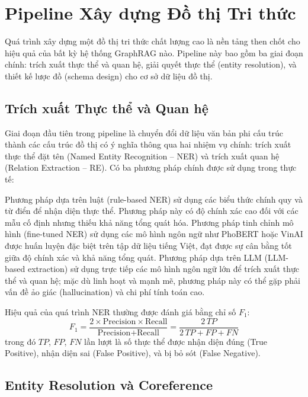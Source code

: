 \documentclass[12pt,a4paper]{report}
\theoremstyle{plain}
\theoremstyle{definition}
\begin{document}
	\section{Pipeline Xây dựng Đồ thị Tri thức}
	\label{sec:kg_pipeline}
	
	Quá trình xây dựng một đồ thị tri thức chất lượng cao là nền tảng then chốt
	cho hiệu quả của bất kỳ hệ thống GraphRAG nào. Pipeline này bao gồm ba giai
	đoạn chính: trích xuất thực thể và quan hệ, giải quyết thực thể (entity
	resolution), và thiết kế lược đồ (schema design) cho cơ sở dữ liệu đồ thị.
	
	\subsection{Trích xuất Thực thể và Quan hệ}
	\label{subsec:ner_relation_extraction}
	
	Giai đoạn đầu tiên trong pipeline là chuyển đổi dữ liệu văn bản phi cấu trúc
	thành các cấu trúc đồ thị có ý nghĩa thông qua hai nhiệm vụ chính: trích xuất
	thực thể đặt tên (Named Entity Recognition -- NER) và trích xuất quan hệ
	(Relation Extraction -- RE). Có ba phương pháp chính được sử dụng trong thực tế:
	
	Phương pháp dựa trên luật (rule-based NER) sử dụng các biểu thức chính quy
	và từ điển để nhận diện thực thể. Phương pháp này có độ chính xác cao đối với
	các mẫu cố định nhưng thiếu khả năng tổng quát hóa. Phương pháp tinh chỉnh mô
	hình (fine-tuned NER) sử dụng các mô hình ngôn ngữ như PhoBERT hoặc VinAI được
	huấn luyện đặc biệt trên tập dữ liệu tiếng Việt, đạt được sự cân bằng tốt giữa
	độ chính xác và khả năng tổng quát. Phương pháp dựa trên LLM (LLM-based
	extraction) sử dụng trực tiếp các mô hình ngôn ngữ lớn để trích xuất thực thể
	và quan hệ; mặc dù linh hoạt và mạnh mẽ, phương pháp này có thể gặp phải vấn
	đề ảo giác (hallucination) và chi phí tính toán cao.
	
	Hiệu quả của quá trình NER thường được đánh giá bằng chỉ số $F_1$:
	\begin{equation}
		F_1 = \frac{2 \times \text{Precision} \times \text{Recall}}
		{\text{Precision} + \text{Recall}}
		= \frac{2\,TP}{2\,TP + FP + FN}
		\label{eq:f1_ner}
	\end{equation}
	trong đó $TP$, $FP$, $FN$ lần lượt là số thực thể được nhận diện đúng (True
	Positive), nhận diện sai (False Positive), và bị bỏ sót (False Negative).
	
	\subsection{Entity Resolution và Coreference}
	\label{subsec:entity_resolution}
	
\end{document}
